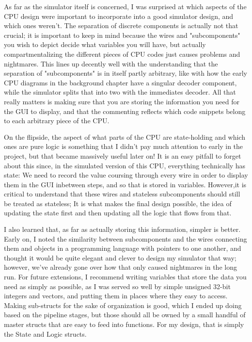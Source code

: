 \documentclass[12pt,twoside]{reedthesis}
\begin{document}
As far as the simulator itself is concerned, I was surprised at which aspects of the CPU design were important to incorporate into a good simulator design, and which ones weren't. The separation of discrete components is actually not that crucial; it is important to keep in mind because the wires and "subcomponents" you wish to depict decide what variables you will have, but actually compartmentalizing the different pieces of CPU codes just causes problems and nightmares. This lines up decently well with the understanding that the separation of "subcomponents" is in itself partly arbitrary, like with how the early CPU diagrams in the background chapter have a singular decoder component, while the simulator splits that into two with the immediates decoder. All that really matters is making sure that you are storing the information you need for the GUI to display, and that the commenting reflects which code snippets belong to each arbitrary piece of the CPU.

On the flipside, the aspect of what parts of the CPU are state-holding and which ones are pure logic is something that I didn't pay much attention to early in the project, but that became massively useful later on! It is an easy pitfall to forget about this since, in the simulated version of this CPU, everything technically has state: We need to record the value coursing through every wire  in order to display them in the GUI inbetween steps, and so that is stored in variables. However,it is critical to understand that these wires and stateless subcomponents  should still be treated as stateless; It is what makes the final design possible, the idea of updating the state first and then updating all the logic that flows from that.

I also learned that, as far as actually storing this information, simpler is better. Early on, I noted the similarity between subcomponents and the wires connecting them and objects in a programming language with pointers to one another, and thought it would be quite elegant and clever to design my simulator that way; however, we've already gone over how that only caused nightmares in the long run. For future extensions, I recommend writing variables that store the data you need as simply as possible, as I was served so well by simple unsigned 32-bit integers and vectors, and putting them in places where they easy to access. Making sub-structs for the sake of organization is good, which I ended up doing based on the pipeline stages, but those should all be owned by a small handful of master structs that are easy to feed into functions. For my design, that is simply the State and Logic structs.
\end{document}
